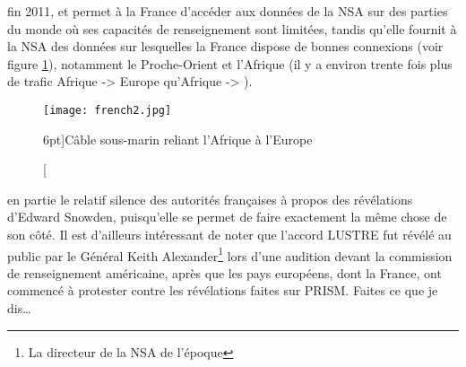  fin 2011\autocite{lustre}, et permet à la France
d'accéder aux données de la NSA sur des parties du monde où ses capacités de renseignement
sont limitées, tandis qu'elle fournit à la NSA des données sur lesquelles la
France dispose de bonnes connexions (voir figure \ref{fig:french2}), notamment
le Proche-Orient et l'Afrique (il y a environ trente fois plus de trafic Afrique -> Europe qu'Afrique ->
\EUA).

\vspace{0.7cm}
\begin{figure}
\texttt{[image: french2.jpg]}
\caption[Câble sous-marin reliant l'Afrique à l'Europe][6pt]{Câble sous-marin
reliant l'Afrique à l'Europe}
\label{fig:french2}
\end{figure}

 en partie le relatif silence des
autorités françaises à propos des révélations d'Edward Snowden, puisqu'elle se
permet de faire exactement la même chose de son côté. Il
est d'ailleurs intéressant de noter que l'accord LUSTRE fut révélé au public par
le Général Keith Alexander\footnote{La directeur de la NSA de l'époque} lors
d'une audition devant la commission de renseignement américaine, après que les pays
européens, dont la France, ont commencé à protester contre les révélations
faites sur PRISM. Faites ce que je dis\ldots